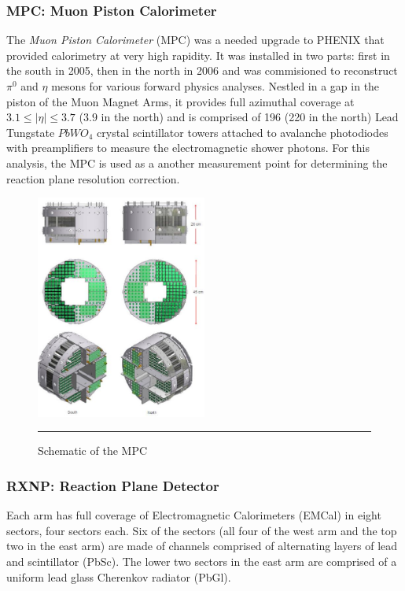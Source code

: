 \subsubsection{MPC: Muon Piston Calorimeter}
The \textit{Muon Piston Calorimeter} (MPC) was a needed upgrade to PHENIX that provided calorimetry at very high rapidity\citep{kleinjanthesis}. It was installed in two parts: first in the south in 2005, then in the north in 2006 and was commisioned to reconstruct $\pi^{0}$ and $\eta$ mesons for various forward physics analyses. Nestled in a gap in the piston of the Muon Magnet Arms, it provides full azimuthal coverage at $3.1 \leq  | \eta | \leq 3.7$ ($3.9$ in the north) and is comprised of 196 (220 in the north) Lead Tungstate $PbWO_4$ crystal scintillator towers attached to avalanche photodiodes with preamplifiers to measure the electromagnetic shower photons. For this analysis, the MPC is used as a another measurement point for determining the reaction plane resolution correction. 

\begin{figure}[h!]
  \centering
    \includegraphics[width=0.5\textwidth]{Figures/mpcschematic.JPG}
    \rule{35em}{0.5pt}
  \caption[Schematic of the MPC]{Schematic of the MPC}
  \label{fig:mpcschematic}
\end{figure}

\subsubsection{RXNP: Reaction Plane Detector}

Each arm has full coverage of Electromagnetic Calorimeters (EMCal) in eight sectors, four sectors each. Six of the sectors (all four of the west arm and the top two in the east arm) are made of channels comprised of alternating layers of lead and scintillator (PbSc). The lower two sectors in the east arm are comprised of a uniform lead glass Cherenkov radiator (PbGl). 

\pagebreak
\pagebreak
